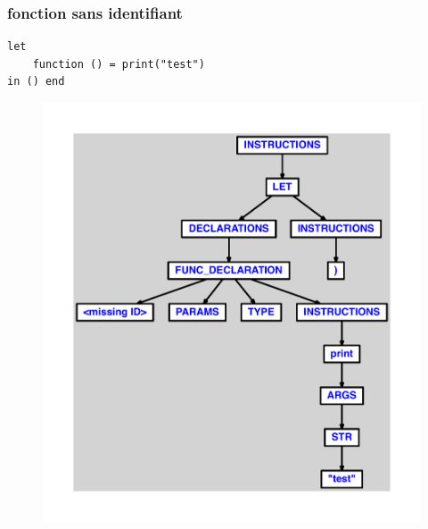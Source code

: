 \documentclass{article}
\begin{document}
\subsubsection{fonction sans identifiant}
\begin{lstlisting}
let
	function () = print("test")
in () end
\end{lstlisting}
\newpage
\begin{figure}[H]
\centering
\includegraphics[max width=\textwidth]{ast/ast_215.pdf}
\end{figure}
\newpage
\end{document}
